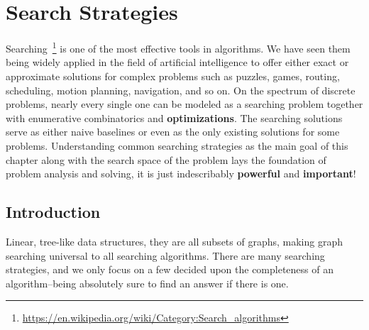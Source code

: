 \documentclass[main.tex]{subfiles}
\begin{document}
\chapter{Search Strategies}

Searching~\footnote{\url{https://en.wikipedia.org/wiki/Category:Search_algorithms}} is one of the most effective tools in algorithms. We  have seen them being widely applied in the field of artificial intelligence  to offer either exact or approximate solutions for complex problems such as puzzles, games, routing, scheduling, motion planning, navigation, and so on. On the spectrum of discrete problems, nearly every single one can be modeled as a searching problem together with enumerative combinatorics and \textbf{optimizations}. The searching solutions  serve as either naive baselines or even as the only existing solutions for some problems. Understanding common searching strategies as the main goal of this chapter along with  the search space of the problem lays the foundation of problem analysis and solving, it is just indescribably \textbf{powerful} and \textbf{important}! 








\section{Introduction}
\label{section_linear_search}

Linear, tree-like data structures, they are all subsets of graphs, making graph searching universal to all searching algorithms. There are many searching strategies, and we only focus on a few decided upon the completeness of an algorithm--being absolutely sure to find an answer if there is one. 
\end{document}
